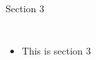 \begin{frame}{Section 3}
    \begin{columns}
        \begin{itemize}
            \item This is section 3 
        \end{itemize}
    \end{columns}
\end{frame}
